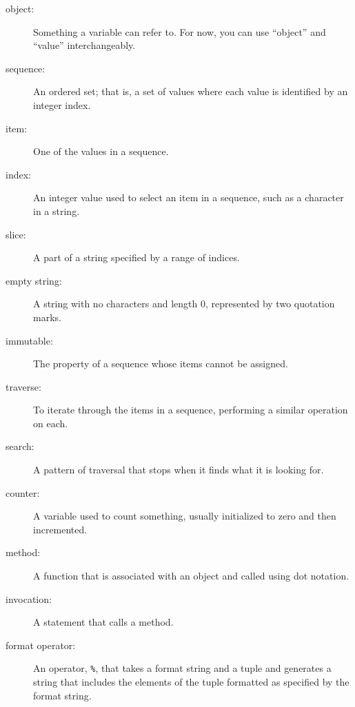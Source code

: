 \documentclass[10pt]{book}
\begin{document}
\begin{description}

\item[object:] Something a variable can refer to.  For now,
you can use ``object'' and ``value'' interchangeably.

\item[sequence:] An ordered set; that is, a set of
values where each value is identified by an integer index.

\item[item:] One of the values in a sequence.

\item[index:] An integer value used to select an item in
a sequence, such as a character in a string.

\item[slice:] A part of a string specified by a range of indices.

\item[empty string:] A string with no characters and length 0, represented
by two quotation marks.

\item[immutable:] The property of a sequence whose items cannot
be assigned.

\item[traverse:] To iterate through the items in a sequence,
performing a similar operation on each.

\item[search:] A pattern of traversal that stops
when it finds what it is looking for.

\item[counter:] A variable used to count something, usually initialized
to zero and then incremented.

\item[method:] A function that is associated with an object and called
using dot notation.

\item[invocation:] A statement that calls a method.

\item[format operator:] An operator, {\tt \%}, that takes a format
string and a tuple and generates a string that includes
the elements of the tuple formatted as specified by the format string.


\end{description}
\end{document}
